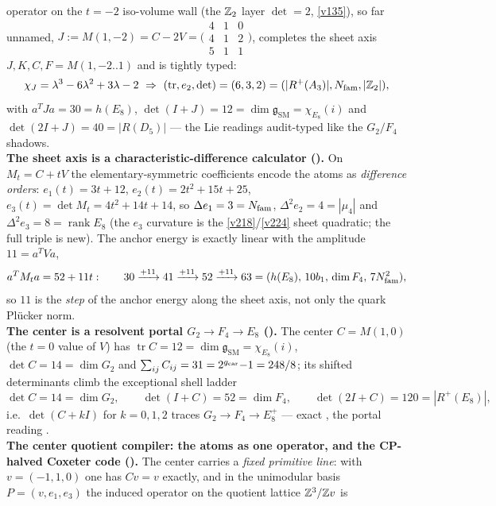 \begin{keybox}
operator on the $t{=}{-}2$ iso-volume wall (the $\mathbb{Z}_2$ layer $\det{=}2$, \vref{v135}), so far unnamed,
$J:=M(1,{-}2)=C-2V=\big(\begin{smallmatrix}4&1&0\\4&1&2\\5&1&1\end{smallmatrix}\big)$, completes the sheet
axis $J,K,C,F=M(1,{-}2..1)$ and is tightly typed:
\[
  \chi_J=\lambda^3-6\lambda^2+3\lambda-2\ \Rightarrow\ (\operatorname{tr},e_2,\det)=(6,3,2)
  =(|R^+(A_3)|,\Nfam,|\Z_2|),
\]
with $a^TJa=30=h(E_8)$, $\det(I{+}J)=12=\dim\mathfrak g_{\mathrm{SM}}=\chi_{E_8}(i)$ and
$\det(2I{+}J)=40=|R(D_5)|$ --- the Lie readings audit-typed like the $G_2/F_4$ shadows.
\smallskip\\
\noindent\textbf{The sheet axis is a characteristic-difference calculator
().} On $M_t=C+tV$ the elementary-symmetric coefficients
encode the atoms as \emph{difference orders}: $e_1(t)=3t{+}12$, $e_2(t)=2t^2{+}15t{+}25$,
$e_3(t)=\det M_t=4t^2{+}14t{+}14$, so $\Delta e_1=3=N_{\mathrm{fam}}$, $\Delta^2 e_2=4=|\mu_4|$ and
$\Delta^2 e_3=8=\operatorname{rank}E_8$ (the $e_3$ curvature is the \vref{v218}/\vref{v224} sheet
quadratic; the full triple is new). The anchor energy is exactly linear with the amplitude $11=a^TVa$,
\[
  a^TM_t a=52+11t:\qquad 30\xrightarrow{+11}41\xrightarrow{+11}52\xrightarrow{+11}63
  =(h(E_8),\,10b_1,\,\dim F_4,\,7N_{\mathrm{fam}}^2),
\]
so $11$ is the \emph{step} of the anchor energy along the sheet axis, not only the quark Pl\"ucker norm.
\smallskip\\
\noindent\textbf{The center is a resolvent portal $G_2\!\to\!F_4\!\to\!E_8$
().} The center $C=M(1,0)$ (the $t{=}0$ value of $V$) has
$\operatorname{tr}C=12=\dim\mathfrak g_{\mathrm{SM}}=\chi_{E_8}(i)$, $\det C=14=\dim G_2$ and
$\sum_{ij}C_{ij}=31=2^{g_{\mathrm{car}}}{-}1=248/8$; its shifted determinants climb the exceptional shell ladder
\[
  \det C=14=\dim G_2,\qquad \det(I{+}C)=52=\dim F_4,\qquad \det(2I{+}C)=120=|R^+(E_8)|,
\]
i.e.\ $\det(C{+}kI)$ for $k=0,1,2$ traces $G_2\!\to\!F_4\!\to\!E_8^+$ --- exact \mE, the portal reading \mC.
\smallskip\\
\noindent\textbf{The center quotient compiler: the atoms as one operator, and the CP-halved Coxeter code
().} The center carries a \emph{fixed primitive line}: with
$v=(-1,1,0)$ one has $Cv=v$ exactly, and in the unimodular basis $P=(v,e_1,e_3)$ the induced operator on
the quotient lattice $\mathbb{Z}^3/\mathbb{Z} v$ is

\end{keybox}

